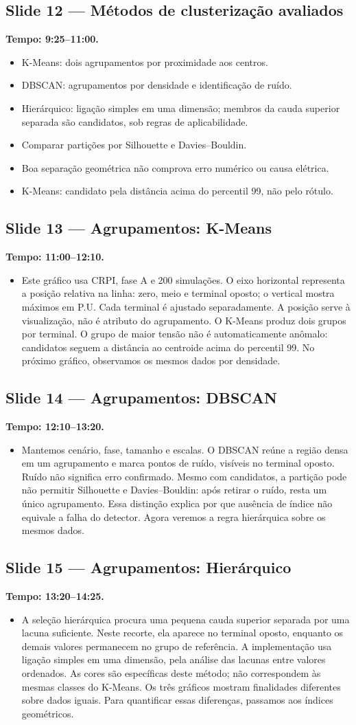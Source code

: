 \documentclass[11pt,a4paper]{article}
\newcommand{\slide}[3]{\Needspace{8\baselineskip}
  \subsection*{Slide #1 --- #2}
  \textbf{Tempo: #3.}\par}
\begin{document}
\slide{12}{Métodos de clusterização avaliados}{9:25--11:00}
\begin{itemize}
\item K-Means: dois agrupamentos por proximidade aos centros.
\item DBSCAN: agrupamentos por densidade e identificação de ruído.
\item Hierárquico: ligação simples em uma dimensão; membros da cauda
superior separada são candidatos, sob regras de aplicabilidade.
\item Comparar partições por Silhouette e Davies--Bouldin.
\item Boa separação geométrica não comprova erro numérico ou causa elétrica.
\item K-Means: candidato pela distância acima do percentil 99, não pelo rótulo.
\end{itemize}

\slide{13}{Agrupamentos: K-Means}{11:00--12:10}
\begin{itemize}
\item Este gráfico usa CRPI, fase A e 200 simulações. O eixo horizontal representa a posição relativa na linha: zero, meio e terminal oposto; o vertical mostra máximos em P.U. Cada terminal é ajustado separadamente. A posição serve à visualização, não é atributo do agrupamento. O K-Means produz dois grupos por terminal. O grupo de maior tensão não é automaticamente anômalo: candidatos seguem a distância ao centroide acima do percentil 99. No próximo gráfico, observamos os mesmos dados por densidade.
\end{itemize}

\slide{14}{Agrupamentos: DBSCAN}{12:10--13:20}
\begin{itemize}
\item Mantemos cenário, fase, tamanho e escalas. O DBSCAN reúne a região densa em um agrupamento e marca pontos de ruído, visíveis no terminal oposto. Ruído não significa erro confirmado. Mesmo com candidatos, a partição pode não permitir Silhouette e Davies--Bouldin: após retirar o ruído, resta um único agrupamento. Essa distinção explica por que ausência de índice não equivale a falha do detector. Agora veremos a regra hierárquica sobre os mesmos dados.
\end{itemize}

\slide{15}{Agrupamentos: Hierárquico}{13:20--14:25}
\begin{itemize}
\item A seleção hierárquica procura uma pequena cauda superior separada por uma lacuna suficiente. Neste recorte, ela aparece no terminal oposto, enquanto os demais valores permanecem no grupo de referência. A implementação usa ligação simples em uma dimensão, pela análise das lacunas entre valores ordenados. As cores são específicas deste método; não correspondem às mesmas classes do K-Means. Os três gráficos mostram finalidades diferentes sobre dados iguais. Para quantificar essas diferenças, passamos aos índices geométricos.
\end{itemize}
\end{document}
